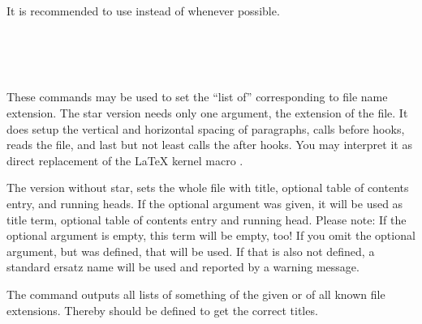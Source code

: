 It is recommended to use  instead
of  whenever possible.
%
%

\begin{Declaration}
  \\
  \\
  \\
\end{Declaration}
%
%
%
%
These commands may be used to set the ``list of'' corresponding to file name
extension. The star version 
needs only one argument, the extension of the file. It does setup the vertical
and horizontal spacing of paragraphs, calls before hooks, reads the file, and
last but not least calls the after hooks.  You may interpret it as direct
replacement of the \LaTeX{} kernel macro
.

The version without star, sets the whole file
with title, optional table of contents entry, and running heads. If the
optional argument  was given, it will be used as
title term, optional table of contents entry and running head. Please
note: If the optional argument is empty, this term will
be empty, too! If you omit the optional argument, but
 was defined, that will be used. If that is
also not defined, a standard ersatz name will be used and reported by a
warning message.

The command  outputs all
lists of something of the given  or of all known file
extensions. Thereby
 should be defined to get the correct
titles.

